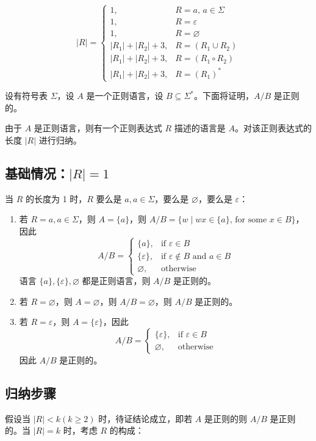 \documentclass[11pt,addpoints,answers]{exam}
\begin{document}
\begin{questions}
\begin{solution}
\[
|R| = 
\begin{cases} 
1, & R = a, \, a \in \Sigma \\
1, & R = \varepsilon \\
1, & R = \varnothing \\
|R_1| + |R_2| + 3, & R = (R_1 \cup R_2) \\
|R_1| + |R_2| + 3, & R = (R_1 \circ R_2) \\
|R_1| + |R_2| + 3, & R = (R_1)^*
\end{cases}
\tag{11.1}
\]

设有符号表 \(\Sigma\)，设 \(A\) 是一个正则语言，设 \(B \subseteq \Sigma^*\)。下面将证明，\(A/B\) 是正则的。

由于 \(A\) 是正则语言，则有一个正则表达式 \(R\) 描述的语言是 \(A\)。对该正则表达式的长度 \(|R|\) 进行归纳。

\subsection*{基础情况：\(|R| = 1\)}
当 \(R\) 的长度为 1 时，\(R\) 要么是 \(a, a \in \Sigma\)，要么是 \(\varnothing\)，要么是 \(\varepsilon\)：

\begin{enumerate}
\item 若 \(R = a, a \in \Sigma\)，则 \(A = \{a\}\)，则 \(A/B = \{w \mid wx \in \{a\}, \, \text{for some } x \in B\}\)，因此
\[
A/B = 
\begin{cases} 
\{a\}, & \text{if } \varepsilon \in B \\
\{\varepsilon\}, & \text{if } \varepsilon \notin B \text{ and } a \in B \\
\varnothing, & \text{otherwise}
\end{cases}
\tag{11.2}
\]
语言 \(\{a\}, \{\varepsilon\}, \varnothing\) 都是正则语言，则 \(A/B\) 是正则的。

\item 若 \(R = \varnothing\)，则 \(A = \varnothing\)，则 \(A/B = \varnothing\)，则 \(A/B\) 是正则的。

\item 若 \(R = \varepsilon\)，则 \(A = \{\varepsilon\}\)，因此
\[
A/B = 
\begin{cases} 
\{\varepsilon\}, & \text{if } \varepsilon \in B \\
\varnothing, & \text{otherwise}
\end{cases}
\tag{11.3}
\]
因此 \(A/B\) 是正则的。
\end{enumerate}

\subsection*{归纳步骤}
假设当 \(|R| < k (k \geq 2)\) 时，待证结论成立，即若 \(A\) 是正则的则 \(A/B\) 是正则的。当 \(|R| = k\) 时，考虑 \(R\) 的构成：


\end{solution}
\end{questions}
\end{document}
